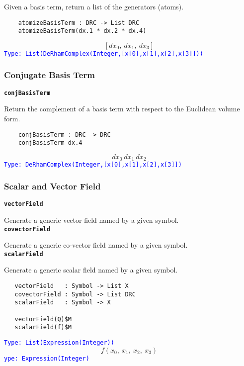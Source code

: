 \documentclass[12pt,a4paper]{article}
\newcommand{\spadbold}[1]{{\tt\bf #1}}
\newcommand{\type}[1]{\textcolor{blue}{\tt\tiny #1}}
\begin{document}
Given a basis term, return a list of the generators (atoms).
\begin{lstlisting}
    atomizeBasisTerm : DRC -> List DRC  
    atomizeBasisTerm(dx.1 * dx.2 * dx.4) 
\end{lstlisting}
\begin{displaymath}
  \left[
   {dx _ {0}}, \: {dx _ {1}}, \: {dx _ {3}}
  \right]
\end{displaymath}
\type{Type: List(DeRhamComplex(Integer,[x[0],x[1],x[2],x[3]]))}
%
\subsubsection{Conjugate Basis Term}
\spadbold{conjBasisTerm}

Return the complement of a basis term with respect to the Euclidean
volume form.
\begin{lstlisting}
    conjBasisTerm : DRC -> DRC    
    conjBasisTerm dx.4
\end{lstlisting}
\begin{displaymath}
	{dx _ {0}} \  {dx _ {1}} \  {dx _ {2}}
\end{displaymath}
\type{Type: DeRhamComplex(Integer,[x[0],x[1],x[2],x[3]])}
%
\subsubsection{Scalar and Vector Field} 
\spadbold{vectorField}

Generate a generic vector field named by a given symbol.
\\
\spadbold{covectorField}

Generate a generic co-vector field named by a given symbol.
\\  
\spadbold{scalarField}

Generate a generic scalar field named by a given symbol.
\begin{lstlisting}
   vectorField   : Symbol -> List X
   covectorField : Symbol -> List DRC
   scalarField   : Symbol -> X
   
   vectorField(Q)$M
   scalarField(f)$M
\end{lstlisting}
\begin{displaymath}
	[Q_1(x_0,x_1,x_2,x_3),Q_2,Q_3,Q_4]
\end{displaymath}
\type{Type: List(Expression(Integer))}
%
\begin{displaymath}
	 f
  \left(
   {{x _ {0}}, \: {x _ {1}}, \: {x _ {2}}, \: {x _ {3}}}
  \right)
\end{displaymath}
\type{ype: Expression(Integer)}
%
\end{document}
